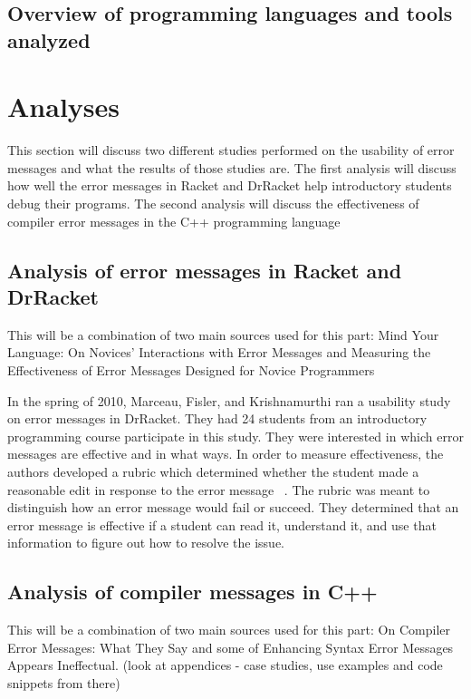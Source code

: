 \documentclass{sig-alternate}
\begin{document}
\subsection{Overview of programming languages and tools analyzed}


\section{Analyses}\label{analyses}
This section will discuss two different studies performed on the usability of error messages and what the results of those studies are. The first analysis will discuss how well the error messages in Racket and DrRacket help introductory students debug their programs. The second analysis will discuss the effectiveness of compiler error messages in the C++ programming language


\subsection{Analysis of error messages in Racket and DrRacket}
This will be a combination of two main sources used for this part: Mind Your Language: On Novices' Interactions with Error Messages and Measuring the Effectiveness of Error Messages Designed for Novice Programmers

In the spring of 2010, Marceau, Fisler, and Krishnamurthi ran a usability study on error messages in DrRacket. They had 24 students from an introductory programming course participate in this study. They were interested in which error messages are effective and in what ways.  In order to measure effectiveness, the authors developed a rubric which determined whether the student made a reasonable edit in response to the error message ~\cite{Marceau:2011:MEE:1953163.1953308}. The rubric was meant to distinguish how an error message would fail or succeed. They determined that an error message is effective if a student can read it, understand it, and use that information to figure out how to resolve the issue. 

\subsection{Analysis of compiler messages in C++}
This will be a combination of two main sources used for this part: On Compiler Error Messages: What They Say and some of Enhancing Syntax Error Messages Appears Ineffectual. (look at appendices - case studies, use examples and code snippets from there)
\end{document}
